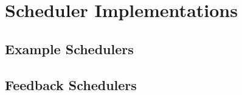 \section{Scheduler Implementations}

\subsection{Example Schedulers}

\subsection{Feedback Schedulers}

